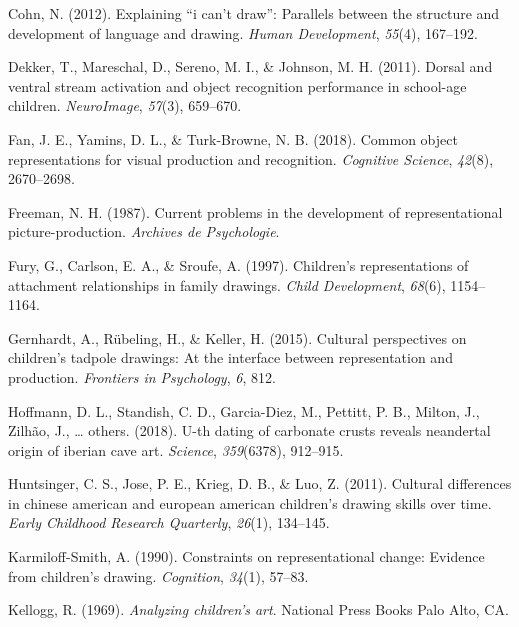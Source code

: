 \documentclass[
  english,
  man]{apa6}
\begin{document}
\leavevmode\hypertarget{ref-cohn2012explaining}{}%
Cohn, N. (2012). Explaining ``i can't draw'': Parallels between the structure and development of language and drawing. \emph{Human Development}, \emph{55}(4), 167--192.

\leavevmode\hypertarget{ref-dekker2011dorsal}{}%
Dekker, T., Mareschal, D., Sereno, M. I., \& Johnson, M. H. (2011). Dorsal and ventral stream activation and object recognition performance in school-age children. \emph{NeuroImage}, \emph{57}(3), 659--670.

\leavevmode\hypertarget{ref-fan2018common}{}%
Fan, J. E., Yamins, D. L., \& Turk-Browne, N. B. (2018). Common object representations for visual production and recognition. \emph{Cognitive Science}, \emph{42}(8), 2670--2698.

\leavevmode\hypertarget{ref-freeman1987current}{}%
Freeman, N. H. (1987). Current problems in the development of representational picture-production. \emph{Archives de Psychologie}.

\leavevmode\hypertarget{ref-fury1997children}{}%
Fury, G., Carlson, E. A., \& Sroufe, A. (1997). Children's representations of attachment relationships in family drawings. \emph{Child Development}, \emph{68}(6), 1154--1164.

\leavevmode\hypertarget{ref-gernhardt2015cultural}{}%
Gernhardt, A., Rübeling, H., \& Keller, H. (2015). Cultural perspectives on children's tadpole drawings: At the interface between representation and production. \emph{Frontiers in Psychology}, \emph{6}, 812.

\leavevmode\hypertarget{ref-hoffmann2018u}{}%
Hoffmann, D. L., Standish, C. D., Garcia-Diez, M., Pettitt, P. B., Milton, J., Zilhão, J., \ldots{} others. (2018). U-th dating of carbonate crusts reveals neandertal origin of iberian cave art. \emph{Science}, \emph{359}(6378), 912--915.

\leavevmode\hypertarget{ref-huntsinger2011cultural}{}%
Huntsinger, C. S., Jose, P. E., Krieg, D. B., \& Luo, Z. (2011). Cultural differences in chinese american and european american children's drawing skills over time. \emph{Early Childhood Research Quarterly}, \emph{26}(1), 134--145.

\leavevmode\hypertarget{ref-karmiloff1990constraints}{}%
Karmiloff-Smith, A. (1990). Constraints on representational change: Evidence from children's drawing. \emph{Cognition}, \emph{34}(1), 57--83.

\leavevmode\hypertarget{ref-kellogg1969analyzing}{}%
Kellogg, R. (1969). \emph{Analyzing children's art}. National Press Books Palo Alto, CA.
\end{document}
